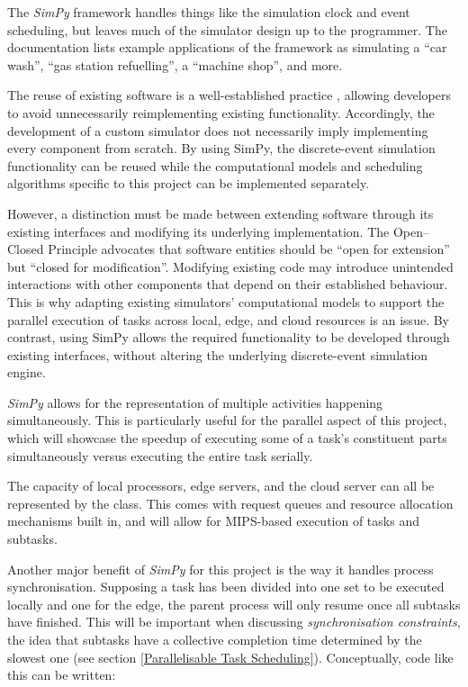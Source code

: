 \documentclass[]{UCD_CS_Interim_Report}
\begin{document}
The \textit{SimPy} framework handles things like the simulation clock and event scheduling, but leaves much of the simulator design up to the programmer. The documentation lists example applications of the framework as simulating a \enquote{car wash}, \enquote{gas station refuelling}, a \enquote{machine shop}, and more.

The reuse of existing software is a well-established practice \cite{meyer1997oosc}, allowing developers to avoid unnecessarily reimplementing existing functionality. Accordingly, the development of a custom simulator does not necessarily imply implementing every component from scratch. By using SimPy, the discrete-event simulation functionality can be reused while the computational models and scheduling algorithms specific to this project can be implemented separately.

However, a distinction must be made between extending software through its existing interfaces and modifying its underlying implementation. The Open–Closed Principle \cite{meyer1997oosc} advocates that software entities should be \enquote{open for extension} but \enquote{closed for modification}. Modifying existing code may introduce unintended interactions with other components that depend on their established behaviour. This is why adapting existing simulators' computational models to support the parallel execution of tasks across local, edge, and cloud resources is an issue. By contrast, using SimPy allows the required functionality to be developed through existing interfaces, without altering the underlying discrete-event simulation engine.

\textit{SimPy} allows for the representation of multiple activities happening simultaneously. This is particularly useful for the parallel aspect of this project, which will showcase the speedup of executing some of a task's constituent parts simultaneously versus executing the entire task serially.

The capacity of local processors, edge servers, and the cloud server can all be represented by the  class. This comes with request queues and resource allocation mechanisms built in, and will allow for MIPS-based execution of tasks and subtasks.

Another major benefit of \textit{SimPy} for this project is the way it handles process synchronisation. Supposing a task has been divided into one set to be executed locally and one for the edge, the parent process will only resume once all subtasks have finished. This will be important when discussing \textit{synchronisation constraints}, the idea that subtasks have a collective completion time determined by the slowest one (see section \ref{Parallelisable Task Scheduling}). Conceptually, code like this can be written:
\end{document}
